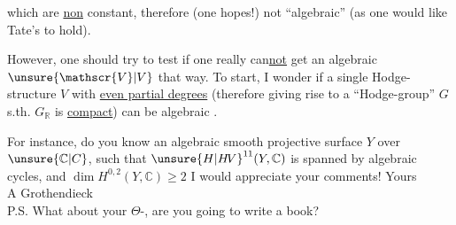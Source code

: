 which are \uline{non} constant, therefore (one hopes!) not ``algebraic'' (as one would like Tate's  to hold).

However, one should try to test if one really can\uline{not} get an algebraic $\unsure{\mathscr{V}|V}$ that way. To start, I wonder if a single Hodge-structure $V$ with \uline{even partial degrees} (therefore giving rise to a ``Hodge-group'' $G$ s.th. $G_{\mathbb{R}}$ is \uline{compact}) can be algebraic .

For instance, do you know an algebraic smooth projective surface $Y$ over $\unsure{\mathbb{C}|C}$, such that ${\unsure{H|H\!V}}^{11}(Y,\mathbb{C})$ is spanned by algebraic cycles, and $\dim H^{0,2}(Y,\mathbb{C})\geq 2$  I would appreciate your comments! \quad Yours\\
A Grothendieck\\

P.S. What about your $\Theta$-, are you going to write a book?
